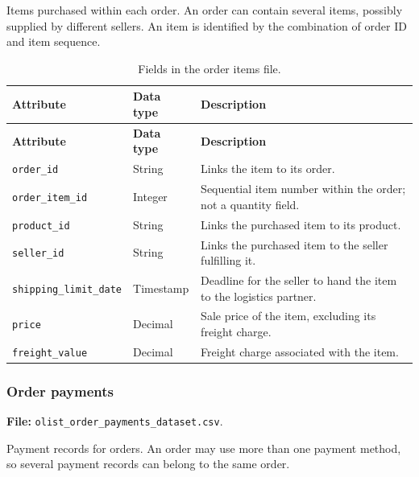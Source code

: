 \documentclass[a4paper,12pt]{article}
\newcommand{\tablestyle}{%
  \small\setstretch{1.05}%
  \renewcommand{\arraystretch}{1.25}%
  \setlength{\extrarowheight}{3pt}%
  \arrayrulecolor{tableborder}%
}
\begin{document}
Items purchased within each order. An order can contain several items, possibly supplied by different sellers. An item is identified by the combination of order ID and item sequence.

{\tablestyle
\begin{longtable}{|L{5.7cm}|L{2.1cm}|L{\dimexpr\textwidth-7.8cm-6\arrayrulewidth\relax}|}
  \caption{Fields in the order items file.}
  \label{tab:dataset-3}\\
  \hline
  \textbf{Attribute} & \textbf{Data type} & \textbf{Description} \\[3pt]\hline
  \endfirsthead
  \hline
  \textbf{Attribute} & \textbf{Data type} & \textbf{Description} \\[3pt]\hline
  \endhead
  \endfoot
  \endlastfoot
  \nolinkurl{order_id} & String & Links the item to its order. \\[3pt]\hline
  \nolinkurl{order_item_id} & Integer & Sequential item number within the order; not a quantity field. \\[3pt]\hline
  \nolinkurl{product_id} & String & Links the purchased item to its product. \\[3pt]\hline
  \nolinkurl{seller_id} & String & Links the purchased item to the seller fulfilling it. \\[3pt]\hline
  \nolinkurl{shipping_limit_date} & Timestamp & Deadline for the seller to hand the item to the logistics partner. \\[3pt]\hline
  \nolinkurl{price} & Decimal & Sale price of the item, excluding its freight charge. \\[3pt]\hline
  \nolinkurl{freight_value} & Decimal & Freight charge associated with the item. \\[3pt]\hline
\end{longtable}
}

\subsubsection{Order payments}

\textbf{File:} \nolinkurl{olist_order_payments_dataset.csv}.

Payment records for orders. An order may use more than one payment method, so several payment records can belong to the same order.
\end{document}
